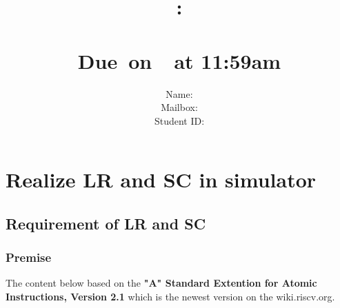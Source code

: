 \documentclass{article}
\title{
    \vspace{2in}
    \textmd{\textbf{\hmwkClass:\\  \hmwkTitle}}\\
    \normalsize\vspace{0.1in}\small{Due\ on\ \hmwkDueDate\ at 11:59am}\\
   \vspace{2in}
}
\author{
	Name: \textbf{\hmwkAuthorName} \\
    Mailbox: \textbf{\hmwkAuthorMail} \\
	Student ID: \hmwkAuthorID}
\date{}
\begin{document}
\maketitle
\pagebreak
\tableofcontents

\pagebreak



\section{Realize LR and SC in simulator}
\subsection{Requirement of LR and SC}
\subsubsection{Premise}
The content below based on the \textbf{"A" Standard Extention for Atomic Instructions, Version 2.1} which is the newest version on the wiki.riscv.org.\\
\end{document}
